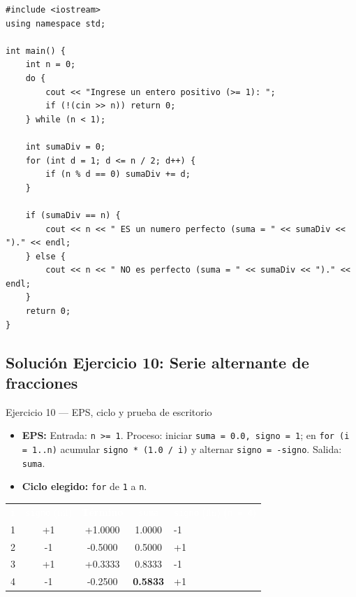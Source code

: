 \documentclass[11pt,letterpaper]{article}
\begin{document}
\begin{lstlisting}[style=cppmonitoria,caption={Solución Ejercicio 9: Número perfecto (C++)}]
#include <iostream>
using namespace std;

int main() {
    int n = 0;
    do {
        cout << "Ingrese un entero positivo (>= 1): ";
        if (!(cin >> n)) return 0;
    } while (n < 1);

    int sumaDiv = 0;
    for (int d = 1; d <= n / 2; d++) {
        if (n % d == 0) sumaDiv += d;
    }

    if (sumaDiv == n) {
        cout << n << " ES un numero perfecto (suma = " << sumaDiv << ")." << endl;
    } else {
        cout << n << " NO es perfecto (suma = " << sumaDiv << ")." << endl;
    }
    return 0;
}
\end{lstlisting}

\subsection{Solución Ejercicio 10: Serie alternante de fracciones}

\begin{solucion}{Ejercicio 10 --- EPS, ciclo y prueba de escritorio}
\begin{itemize}
  \item \textbf{EPS:} Entrada: \texttt{n >= 1}. Proceso: iniciar \texttt{suma = 0.0, signo = 1}; en \texttt{for (i = 1..n)} acumular \texttt{signo * (1.0 / i)} y alternar \texttt{signo = -signo}. Salida: \texttt{suma}.
  \item \textbf{Ciclo elegido:} \texttt{for} de \texttt{1} a \texttt{n}.
\end{itemize}
\begin{center}
\footnotesize
\renewcommand{\arraystretch}{1.15}
\begin{tabularx}{0.88\linewidth}{c c c c X}
\rowcolor{AzulMarino}
\textcolor{white}{\texttt{i}} & \textcolor{white}{\texttt{signo} (ini)} & \textcolor{white}{\textbf{Término}} & \textcolor{white}{\texttt{suma}} & \textcolor{white}{\texttt{signo} (fin) (\texttt{n = 4})} \\
1 & +1 & +1.0000 & 1.0000 & -1 \\
2 & -1 & -0.5000 & 0.5000 & +1 \\
3 & +1 & +0.3333 & 0.8333 & -1 \\
4 & -1 & -0.2500 & \textbf{0.5833} & +1 \\
\bottomrule
\end{tabularx}
\end{center}
\end{solucion}
\end{document}
